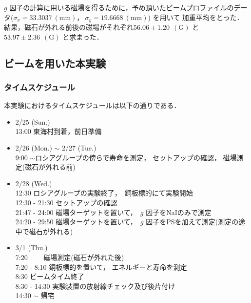 $g$ 因子の計算に用いる磁場を得るために，予め頂いたビームプロファイルのデータ($\sigma_x=33.3037~(\mathrm{mm})，\ \sigma_y=19.6668~(\mathrm{mm})$) を用いて
加重平均をとった．
結果，磁石が外れる前後の磁場がそれぞれ$56.06\pm 1.20\ ~(\mathrm{G})$ と$53.97\pm 2.36\ ~(\mathrm{G})$ と求まった．
\newpage
\subsection{ビームを用いた本実験}
\subsubsection{タイムスケジュール}
本実験におけるタイムスケジュールは以下の通りである．
\begin{itemize}
\item 2/25 (Sun.)\\
  13:00   東海村到着，前日準備
\item 2/26 (Mon.) $\sim$ 2/27 (Tue.)\\
  9:00 $\sim$ロシアグループの傍らで寿命を測定， セットアップの確認， 磁場測定(磁石が外れる前)
\item 2/28 (Wed.)\\
  12:30   ロシアグループの実験終了，\ 銅板標的にて実験開始\\ 
  12:30 - 21:30 セットアップの確認\\
  21:47 - 24:00 磁場ターゲットを置いて，\ $g$ 因子をNaIのみで測定\\
  24:20 - 29:50 磁場ターゲットを置いて，\ $g$ 因子をPSを加えて測定(測定の途中で磁石が外れる)
\item 3/1 (Thu.)\\
  7:20 　　磁場測定(磁石が外れた後)\\
  7:20 - 8:10 銅板標的を置いて， エネルギーと寿命を測定\\
  8:30   ビームタイム終了\\
  8:30 - 14:30 実験装置の放射線チェック及び後片付け \\
  14:30 $\sim$ 帰宅
\end{itemize}
